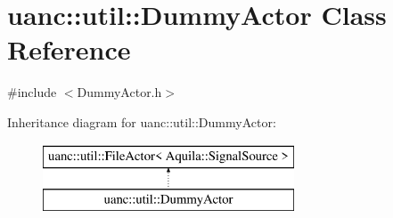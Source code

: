\hypertarget{classuanc_1_1util_1_1_dummy_actor}{}\section{uanc\+:\+:util\+:\+:Dummy\+Actor Class Reference}
\label{classuanc_1_1util_1_1_dummy_actor}


{\ttfamily \#include $<$Dummy\+Actor.\+h$>$}

Inheritance diagram for uanc\+:\+:util\+:\+:Dummy\+Actor\+:\begin{figure}[H]
\begin{center}
\leavevmode
\includegraphics[height=2.000000cm]{classuanc_1_1util_1_1_dummy_actor}
\end{center}
\end{figure}
